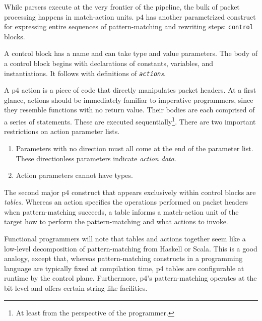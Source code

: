 

While parsers execute at the very frontier of the pipeline, the bulk of packet
processing happens in match-action units.
\acrshort{p4} has another parametrized construct for expressing entire sequences
of pattern-matching and rewriting steps: \texttt{control} blocks.

A control block has a name and can take type and value parameters. The body of a
control block begins with declarations of constants, variables, and
instantiations. It follows with definitions of \emph{\texttt{action}s}.

A \acrshort{p4} action is a piece of code that directly
manipulates packet headers. At a first glance, actions should be immediately
familiar to imperative programmers, since they resemble functions with no return
value. Their bodies are each comprised of a series of statements. These are
executed sequentially\footnote{At least from the perspective of the
programmer.}. There are two important restrictions on action parameter lists.

\begin{enumerate}
	\item Parameters with no direction must all come at the end of the parameter
	list. These directionless parameters indicate \emph{action
	data}.
	\item Action parameters cannot have \extern types.
\end{enumerate}

The second major \acrshort{p4} construct that appears exclusively
within control blocks are \emph{tables}. Whereas an action specifies the
operations performed on packet headers when pattern-matching succeeds, a table
informs a match-action unit of the target how to perform the pattern-matching
and what actions to invoke.

Functional programmers will note that tables and actions together seem like a
low-level decomposition of pattern-matching from Haskell or Scala. This is a
good analogy, except that, whereas pattern-matching constructs in a programming
language are typically fixed at compilation time, \acrshort{p4} tables are
configurable at runtime by the control plane. Furthermore, \acrshort{p4}'s
pattern-matching operates at the bit level and offers certain string-like
facilities.

